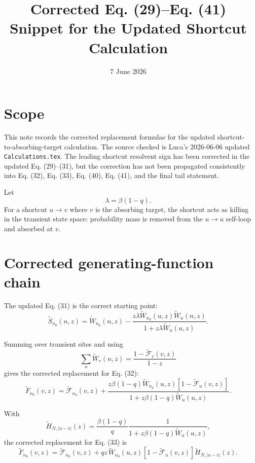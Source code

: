 \documentclass[11pt]{article}
\title{Corrected Eq. (29)--Eq. (41) Snippet for the Updated Shortcut Calculation}
\author{}
\date{7 June 2026}
\newcommand{\wt}{\widetilde}
\newcommand{\Fcal}{\mathcal{F}}
\begin{document}
\maketitle

\section*{Scope}

This note records the corrected replacement formulae for the updated
shortcut-to-absorbing-target calculation.  The source checked is Luca's
2026-06-06 updated \texttt{Calculations.tex}.  The leading shortcut resolvent
sign has been corrected in the updated Eq. (29)--(31), but the correction has
not been propagated consistently into Eq. (32), Eq. (33), Eq. (40), Eq. (41),
and the final tail statement.

Let
\[
  \lambda=\beta(1-q).
\]
For a shortcut \(u\to v\) where \(v\) is the absorbing target, the shortcut
acts as killing in the transient state space: probability mass is removed from
the \(u\to u\) self-loop and absorbed at \(v\).

\section*{Corrected generating-function chain}

The updated Eq. (31) is the correct starting point:
\begin{equation}
  \wt S_{n_0}(n,z)
  =
  \wt W_{n_0}(n,z)
  -
  \frac{
    z\lambda \wt W_{n_0}(u,z)\wt W_u(n,z)
  }{
    1+z\lambda \wt W_u(u,z)
  }.
  \label{eq:snippet-S-correct}
\end{equation}

Summing over transient sites and using
\[
  \sum_n \wt W_r(n,z)=
  \frac{1-\wt{\Fcal}_r(v,z)}{1-z}
\]
gives the corrected replacement for Eq. (32):
\begin{equation}
  \boxed{
  \wt F_{n_0}(v,z)=
  \wt{\Fcal}_{n_0}(v,z)
  +
  \frac{
    z\beta(1-q)\wt W_{n_0}(u,z)
    \left[1-\wt{\Fcal}_u(v,z)\right]
  }{
    1+z\beta(1-q)\wt W_u(u,z)
  }}.
  \label{eq:snippet-F-correct}
\end{equation}

With
\begin{equation}
  \wt H_{N,|u-v|}(z)
  =
  \frac{\beta(1-q)}{q}
  \frac{1}{1+z\beta(1-q)\wt W_u(u,z)},
  \label{eq:snippet-H-def}
\end{equation}
the corrected replacement for Eq. (33) is
\begin{equation}
  \boxed{
  \wt F_{n_0}(v,z)=
  \wt{\Fcal}_{n_0}(v,z)
  +
  qz\,\wt W_{n_0}(u,z)
  \left[1-\wt{\Fcal}_u(v,z)\right]
  \wt H_{N,|u-v|}(z)}.
  \label{eq:snippet-F-H-correct}
\end{equation}
\end{document}
